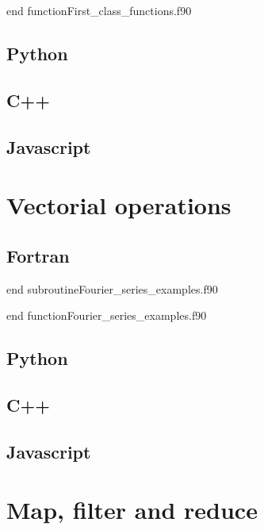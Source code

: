 \newpage 
{}
{end function}{First_class_functions.f90}

\newpage
\subsection{Python}

\newpage
\subsection{C++}

\newpage
\subsection{Javascript}



\section{Vectorial operations}
\subsection{Fortran}

 \newpage 
 {end subroutine}{Fourier_series_examples.f90}



{end function}{Fourier_series_examples.f90}


\newpage
\subsection{Python}

\newpage
\subsection{C++}

\newpage
\subsection{Javascript}



 
\newpage  
\section{Map, filter and reduce} 

